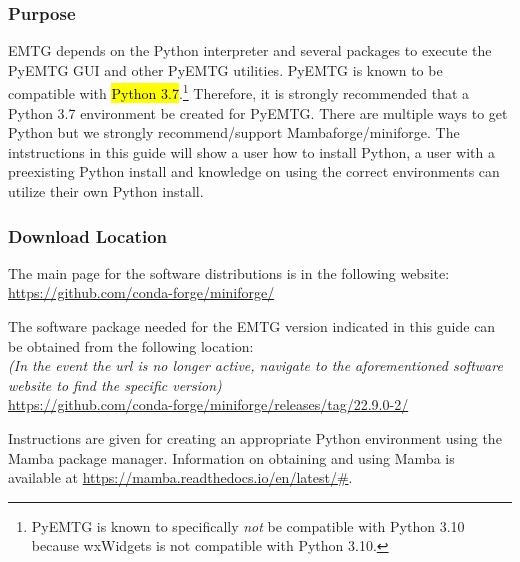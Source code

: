 
\subsubsection{Purpose}
\noindent \ac{EMTG} depends on the Python interpreter and several packages to execute the PyEMTG \ac{GUI} and other PyEMTG utilities. PyEMTG is known to be compatible with \hl{Python 3.7}.\footnote{PyEMTG is known to specifically \emph{not} be compatible with Python 3.10 because wxWidgets is not compatible with Python 3.10.} Therefore, it is strongly recommended that a Python 3.7 environment be created for PyEMTG. There are multiple ways to get Python but we strongly recommend/support Mambaforge/miniforge. The intstructions in this guide will show a user how to install Python, a user with a preexisting Python install and knowledge on using the correct environments can utilize their own Python install.

\subsubsection{Download Location}
\noindent The main page for the software distributions is in the following website: \\
\url{https://github.com/conda-forge/miniforge/}

\noindent The software package needed for the EMTG version indicated in this guide can be obtained from the following location: \\
\emph{(In the event the url is no longer active, navigate to the aforementioned software website to find the specific version)} \\
\url{https://github.com/conda-forge/miniforge/releases/tag/22.9.0-2/}

\noindent Instructions are given for creating an appropriate Python environment using the Mamba package manager. Information on obtaining and using Mamba is available at \url{https://mamba.readthedocs.io/en/latest/#}. 

